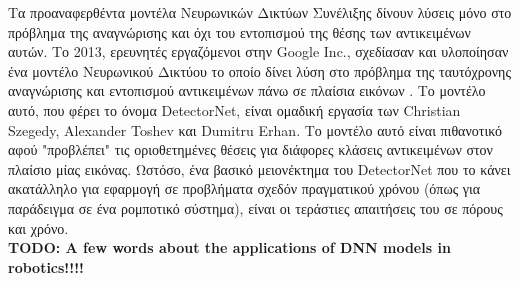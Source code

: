 Τα προαναφερθέντα μοντέλα Νευρωνικών Δικτύων Συνέλιξης δίνουν
λύσεις μόνο στο πρόβλημα της αναγνώρισης και όχι
του εντοπισμού της θέσης των αντικειμένων αυτών.
Το 2013, ερευνητές εργαζόμενοι στην Google Inc., σχεδίασαν και υλοποίησαν ένα
μοντέλο Νευρωνικού Δικτύου το οποίο δίνει λύση στο πρόβλημα της ταυτόχρονης
αναγνώρισης και εντοπισμού αντικειμένων πάνω σε πλαίσια εικόνων \cite{szegedy2013deep}.
Το μοντέλο αυτό, που φέρει το όνομα DetectorNet, είναι ομαδική εργασία των
Christian Szegedy, Alexander Toshev και Dumitru Erhan. Το μοντέλο αυτό είναι
πιθανοτικό αφού "προβλέπει" τις οριοθετημένες θέσεις για διάφορες κλάσεις
αντικειμένων στον πλαίσιο μίας εικόνας. Ωστόσο, ένα βασικό μειονέκτημα του DetectorNet
που το κάνει ακατάλληλο για εφαρμογή σε προβλήματα σχεδόν πραγματικού χρόνου (όπως
για παράδειγμα σε ένα ρομποτικό σύστημα), είναι οι τεράστιες απαιτήσεις του σε πόρους
και χρόνο.
\\

\textbf{TODO: A few words about the applications of DNN models in robotics!!!!}

%
%
